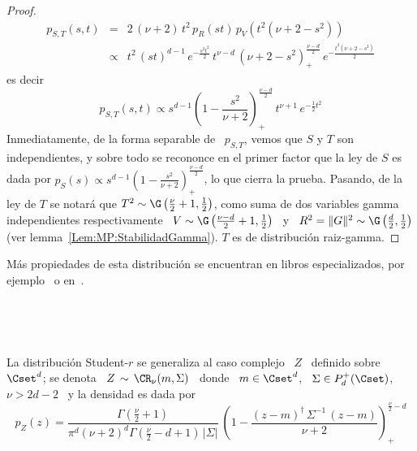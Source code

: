 \begin{proof}
\begin{eqnarray*}
  p_{S,T}(s,t) & = & 2 \, (\nu+2) \, t^2 \, p_R(st) \, p_V\left( t^2 (\nu+2-s^2)
  \right)\\[2mm]
  & \propto & t^2 \, (s t)^{d-1} \, e^{-\frac{s^2 t^2}{2}} \, t^{\nu-d} \,
  \left( \nu+2-s^2 \right)_+^{\frac{\nu-d}{2}} \, e^{-\frac{t^2 (\nu+2-s^2)}{2}}
  \end{eqnarray*}
  es decir
  \[
  p_{S,T}(s,t)     \propto    s^{d-1}     \left(    1     -    \frac{s^2}{\nu+2}
  \right)_+^{\frac{\nu-d}{2}} \, t^{\nu+1} \, e^{-\frac12 t^2}
    \]
    Inmediatamente, de  la forma separable de  \ $p_{S,T}$, vemos que  $S$ y $T$
    son independientes, y sobre todo se recononce en el primer factor que la ley
    de  $S$ es dada  por $p_S(s)  \propto s^{d-1}  \left( 1  - \frac{s^2}{\nu+2}
    \right)_+^{\frac{\nu-d}{2}}$, lo que cierra la prueba. Pasando, de la ley de
    $T$ se notar\'a que $T^2 \sim \G\left( \frac{\nu}{2} + 1 , \frac12 \right)$,
    como suma  de dos variables  gamma independientes respectivamente \  $V \sim
    \G\left(  \frac{\nu-d}{2}+1 , \frac12  \right)$ \  y \  $R^2 =  \|G\|^2 \sim
    \G\left(        \frac{d}{2}       ,       \frac12        \right)$       (ver
    lemma~\ref{Lem:MP:StabilidadGamma}). $T$ es de distribuci\'on raiz-gamma.
\end{proof}

M\'as propiedades de esta distribuci\'on se encuentran en libros especializados,
por ejemplo~\cite{FanKot90, KotBal00} o en~\cite[Sec.~3.2.1]{Zoz12}.

\

\

La distribuci\'on  Student-$r$ se generaliza al  caso complejo \  $Z$ \ definido
sobre $\Cset^d$; se denota  \ $Z \, \sim \, \CR_\nu(m,\Sigma)$ \  donde \ $m \in
\Cset^d$, \ $\Sigma \in P_d^+(\Cset)$, \ $\nu > 2 d - 2$ \ y la densidad es dada
por \
%
\[
p_Z(z) = \frac{\Gamma\left( \frac{\nu}{2} + 1 \right)}{\pi^d (\nu+2)^d \Gamma\left(
    \frac{\nu}{2} - d + 1   \right)  \,   \left|   \Sigma  \right|}   \:   \left(  1   -
  \frac{(z-m)^\dag \, \Sigma^{-1} \, (z-m)}{\nu+2} \right)_+^{\frac{\nu}{2}-d}
\]

\

